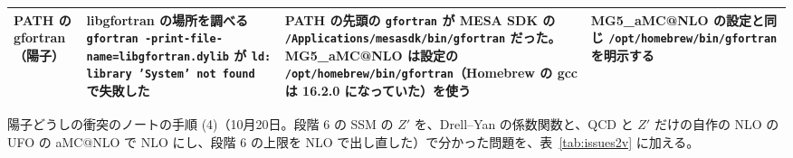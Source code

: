 \documentclass[a4paper,10pt]{ltjsarticle}
\makeatletter
\newcommand{\MGaMC}{MG5\_aMC@NLO}
\makeatother
\begin{document}
\begin{table}[tbp]
\begin{tabularx}{\linewidth}{>{\raggedright\arraybackslash}p{2.4cm}>{\raggedright\arraybackslash}X>{\raggedright\arraybackslash}X>{\raggedright\arraybackslash}X}
PATH の gfortran（陽子） & libgfortran の場所を調べる \nolinkurl{gfortran -print-file-name=libgfortran.dylib} が \texttt{ld: library 'System' not found} で失敗した & PATH の先頭の \texttt{gfortran} が MESA SDK の \nolinkurl{/Applications/mesasdk/bin/gfortran} だった。\MGaMC{} は設定の \nolinkurl{/opt/homebrew/bin/gfortran}（Homebrew の gcc は 16.2.0 になっていた）を使う & \MGaMC{} の設定と同じ \nolinkurl{/opt/homebrew/bin/gfortran} を明示する \\
\bottomrule
\end{tabularx}
\end{table}

陽子どうしの衝突のノートの手順 (4)（10月20日。段階 6 の SSM の $Z'$ を、Drell--Yan の係数関数と、QCD と $Z'$ だけの自作の NLO の UFO の aMC@NLO で NLO にし、段階 6 の上限を NLO で出し直した）で分かった問題を、表~\ref{tab:issues2v} に加える。
\end{document}
